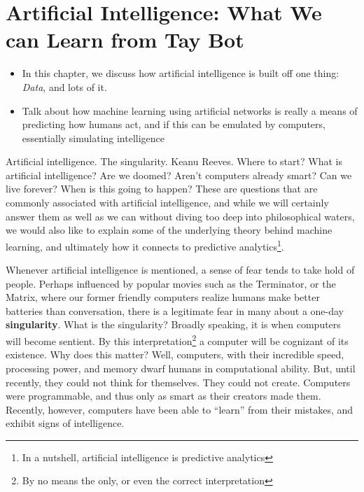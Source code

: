\documentclass[12pt,twoside]{book}
\newcommand{\imp}[1]{\textbf{#1}}
\begin{document}
	\chapter[Rise of the Bots]{Artificial Intelligence: What We can Learn from Tay Bot}
	\begin{itemize}
		\item In this chapter, we discuss how artificial intelligence is built off one thing: \emph{Data}, and lots of it.
		\item Talk about how machine learning using artificial networks is really a means of predicting how humans act, and if this can be emulated by computers, essentially simulating intelligence
	\end{itemize}
	Artificial intelligence.  The singularity.  Keanu Reeves.  Where to start?  What is artificial intelligence?  Are we doomed?  Aren't computers already smart?  Can we live forever?  When is this going to happen? These are questions that are commonly associated with artificial intelligence, and while we will certainly answer them as well as we can without diving too deep into philosophical waters, we would also like to explain some of the underlying theory behind machine learning, and ultimately how it connects to predictive analytics\footnote{In a nutshell, artificial intelligence is predictive analytics}.  
	
	Whenever artificial intelligence is mentioned, a sense of fear tends to take hold of people.  Perhaps influenced by popular movies such as the Terminator, or the Matrix, where our former friendly computers realize humans make better batteries than conversation, there is a legitimate fear in many about a one-day \imp{singularity}. What is the singularity?  Broadly speaking, it is when computers will become sentient.  By this interpretation\footnote{By no means the only, or even the correct interpretation}  a computer will be cognizant of its existence.  Why does this matter?  Well, computers, with their incredible speed, processing power, and memory dwarf humans in computational ability.  But, until recently, they could not think for themselves.  They could not create.  Computers were programmable, and thus only as smart as their creators made them.  Recently, however, computers have been able to ``learn'' from their mistakes, and exhibit signs of intelligence. 
	
\end{document}
